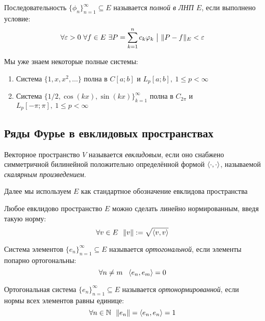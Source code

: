 \begin{definition}
	Последовательность $\{\phi_n\}_{n = 1}^\infty \subseteq E$ называется \textit{полной в ЛНП $E$}, если выполнено условие:
	\[
		\forall \varepsilon > 0\ \forall f \in E\ \exists P = \sum_{k = 1}^n c_k\varphi_k \ \big|\  \|P - f\|_E < \varepsilon
	\]
\end{definition}

\begin{corollary}
	Мы уже знаем некоторые полные системы:
	\begin{enumerate}
		\item Система $\{1, x, x^2, \ldots\}$ полна в $C[a; b]$ и $L_p[a; b],\ 1 \le p < \infty$
		
		\item Система $\{1 / 2, \cos(kx), \sin(kx)\}_{k = 1}^\infty$ полна в $C_{2\pi}$ и $L_p[-\pi; \pi],\ 1 \le p < \infty$
	\end{enumerate}
\end{corollary}

\subsection{Ряды Фурье в евклидовых пространствах}

\begin{reminder}
	Векторное пространство $V$ называется \textit{евклидовым}, если оно снабжено симметричной билинейной положительно определённой формой $\left\langle\cdot, \cdot\right\rangle$, называемой \textit{скалярным произведением}.
\end{reminder}

\begin{note}
	Далее мы используем $E$ как стандартное обозначение евклидова пространства
\end{note}

\begin{reminder}
	Любое евклидово пространство $E$ можно сделать линейно нормированным, введя такую норму:
	\[
		\forall v \in E\ \ \|v\| := \sqrt{\left\langle v, v\right\rangle}
	\]
\end{reminder}

\begin{definition}
	Система элементов $\{e_n\}_{n = 1}^\infty \subseteq E$ называется \textit{ортогональной}, если элементы попарно ортогональны:
	\[
		\forall n \neq m\ \ \left\langle e_n, e_m\right\rangle = 0
	\]
\end{definition}

\begin{definition}
	Ортогональная система $\{e_n\}_{n = 1}^\infty \subseteq E$ называется \textit{ортонормированной}, если нормы всех элементов равны единице:
	\[
		\forall n \in \mathbb{N}\ \ \|e_n\| = \left\langle e_n, e_n\right\rangle = 1
	\]
\end{definition}


